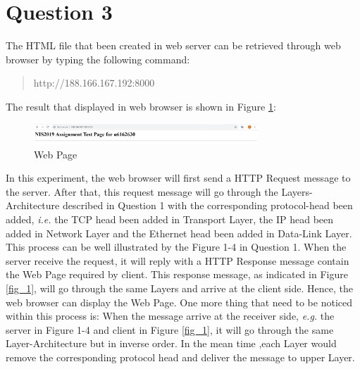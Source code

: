 \documentclass[10pt,a4paper]{article}
\begin{document}
\section*{Question 3}
The HTML file that been created in web server can be retrieved through web browser by typing the following command:
\begin{quote}
	\center
	http://188.166.167.192:8000
\end{quote}
The result that displayed in web browser is shown in Figure \ref{web}:
\begin{figure}[H]
	\center
	\includegraphics[width = 0.75\textwidth]{web_page}
	\caption{Web Page}
	\label{web}
\end{figure}
In this experiment, the web browser will first send a HTTP Request message to the server. After that, this request message will go through the Layers-Architecture described in Question 1 with the corresponding protocol-head been added, \textsl{i.e.} the TCP head been added in Transport Layer, the IP head been added in Network Layer and the Ethernet head been added in Data-Link Layer. This process can be well illustrated by the Figure 1-4 in Question 1. When the server receive the request, it will reply with a HTTP Response message contain the Web Page required by client. This response message, as indicated in Figure \ref{fig_1}, will go through the same Layers and arrive at the client side. Hence, the web browser can display the Web Page. One more thing that need to be noticed within this process is: When the message arrive at the receiver side, \textsl{e.g.} the server in Figure 1-4 and client in Figure \ref{fig_1}, it will go through the same Layer-Architecture but in inverse order. In the mean time ,each Layer would remove the corresponding protocol head and deliver the message to upper Layer.
\end{document}
